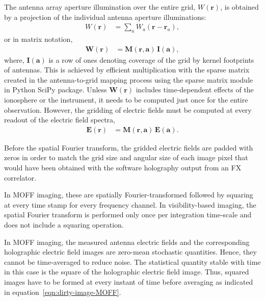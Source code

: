 \documentclass[a4paper,fleqn,usenatbib]{mnras}
\begin{document}
\par\medskip
{}
\par\medskip
\noindent The antenna array aperture illumination over the entire grid, $W(\mathbf{r})$, is obtained by a projection of the individual antenna aperture illuminations:
\begin{align}\label{eqn:gridding-convolution}
  W(\mathbf{r}) &= \sum_a W_a(\mathbf{r}-\mathbf{r}_a),
\end{align}
or in matrix notation,
\begin{align}
  \mathbf{W}(\mathbf{r}) &= \mathbf{M}(\mathbf{r},\mathbf{a})\,\mathbf{I}(\mathbf{a}),
\end{align}
where, $\mathbf{I}(\mathbf{a})$ is a row of ones denoting coverage of the grid by kernel footprints of antennas. This is achieved by efficient multiplication with the sparse matrix created in the antenna-to-grid mapping process using the sparse matrix module in Python SciPy package. Unless $\mathbf{W}(\mathbf{r})$ includes time-dependent effects of the ionosphere or the instrument, it needs to be computed just once for the entire observation. However, the gridding of electric fields must be computed at every readout of the electric field spectra,
\begin{align}
  \mathbf{E}(\mathbf{r}) &= \mathbf{M}(\mathbf{r},\mathbf{a})\,\mathbf{E}(\mathbf{a}).
\end{align}

\par\medskip
{}
\par\medskip
\noindent Before the spatial Fourier transform, the gridded electric fields are padded with zeros in order to match the grid size and angular size of each image pixel that would have been obtained with the software holography output from an FX correlator. 

In MOFF imaging, these are spatially Fourier-transformed followed by squaring at every time stamp for every frequency channel. In visibility-based imaging, the spatial Fourier transform is performed only once per integration time-scale and does not include a squaring operation.

\par\medskip
{}
\par\medskip
\noindent In MOFF imaging, the measured antenna electric fields and the corresponding holographic electric field images are zero-mean stochastic quantities. Hence, they cannot be time-averaged to reduce noise. The statistical quantity stable with time in this case is the square of the holographic electric field image. Thus, squared images have to be formed at every instant of time before averaging as indicated in equation~\ref{eqn:dirty-image-MOFF}.
\end{document}
